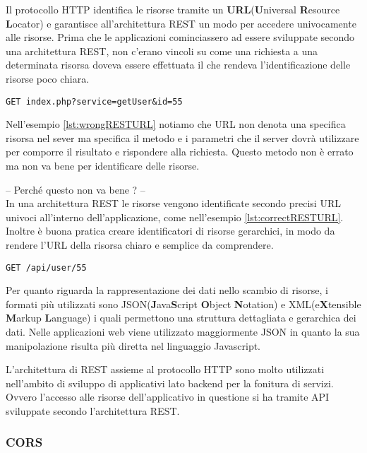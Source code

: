 Il protocollo HTTP identifica le risorse tramite un \textbf{URL}(\textbf{U}niversal \textbf{R}esource \textbf{L}ocator) e garantisce all'architettura REST un modo per accedere univocamente alle risorse.
Prima che le applicazioni cominciassero ad essere sviluppate secondo una architettura REST, non c'erano vincoli su come una richiesta a una determinata risorsa doveva essere effettuata il che rendeva l'identificazione delle risorse poco chiara.
\begin{lstlisting}[caption={Esempio di URL che non rispetta il vincolo di REST}, label={lst:wrongRESTURL}]
	GET index.php?service=getUser&id=55
\end{lstlisting}
Nell'esempio \ref{lst:wrongRESTURL} notiamo che URL non denota una specifica risorsa nel sever ma specifica il metodo e i parametri che il server dovrà utilizzare per comporre il risultato e rispondere alla richiesta. Questo metodo non è errato ma non va bene per identificare delle risorse.

-- Perché questo non va bene ? --\\

In una architettura REST le risorse vengono identificate secondo precisi URL univoci all'interno dell'applicazione, come nell'esempio \ref{lst:correctRESTURL}.
Inoltre è buona pratica creare identificatori di risorse gerarchici, in modo da rendere l'URL della risorsa chiaro e semplice da comprendere.

\begin{lstlisting}[caption={Identificazione di una risorsa all'interno di una architettura REST}, label={lst:correctRESTURL}]
	GET /api/user/55
\end{lstlisting}

Per quanto riguarda la rappresentazione dei dati nello scambio di risorse, i formati più utilizzati sono JSON(\textbf{J}ava\textbf{S}cript \textbf{O}bject \textbf{N}otation) e XML(e\textbf{X}tensible \textbf{M}arkup \textbf{L}anguage) i quali permettono una struttura dettagliata e gerarchica dei dati. Nelle applicazioni web viene utilizzato maggiormente JSON in quanto la sua manipolazione risulta più diretta nel linguaggio Javascript.

L'architettura di REST assieme al protocollo HTTP sono molto utilizzati nell'ambito di sviluppo di applicativi lato backend per la fonitura di servizi. Ovvero l'accesso alle risorse dell'applicativo in questione si ha tramite API sviluppate secondo l'architettura REST.



\subsubsection{CORS}

